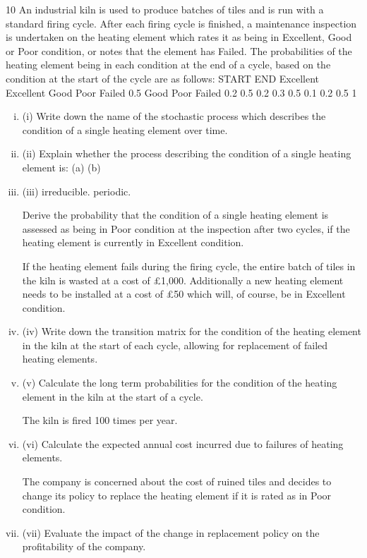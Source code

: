 \documentclass[a4paper,12pt]{article}
\begin{document}
\begin{enumerate}
10
An industrial kiln is used to produce batches of tiles and is run with a standard firing cycle. After each firing cycle is finished, a maintenance inspection is undertaken on the heating element which rates it as being in Excellent, Good or Poor condition, or
notes that the element has Failed.
The probabilities of the heating element being in each condition at the end of a cycle,
based on the condition at the start of the cycle are as follows:
START
END
Excellent
Excellent
Good
Poor
Failed
0.5
Good Poor Failed
0.2
0.5 0.2
0.3
0.5 0.1
0.2
0.5
1

\begin{enumerate}[(i)]
\item (i) Write down the name of the stochastic process which describes the condition of a single heating element over time.

\item (ii) Explain whether the process describing the condition of a single heating
element is:
(a)
(b)
\item (iii)
irreducible.
periodic.

Derive the probability that the condition of a single heating element is assessed as being in Poor condition at the inspection after two cycles, if the heating element is currently in Excellent condition.

If the heating element fails during the firing cycle, the entire batch of tiles in the kiln is wasted at a cost of £1,000. Additionally a new heating element needs to be installed at a cost of £50 which will, of course, be in Excellent condition.
\item (iv) Write down the transition matrix for the condition of the heating element in the kiln at the start of each cycle, allowing for replacement of failed heating elements.
\item (v) Calculate the long term probabilities for the condition of the heating element in the kiln at the start of a cycle.

The kiln is fired 100 times per year.
\item (vi)
Calculate the expected annual cost incurred due to failures of heating
elements.

The company is concerned about the cost of ruined tiles and decides to change its policy to replace the heating element if it is rated as in Poor condition.
\item (vii)
Evaluate the impact of the change in replacement policy on the profitability of
the company.
\end{enumerate}



\end{enumerate}
\end{document}
